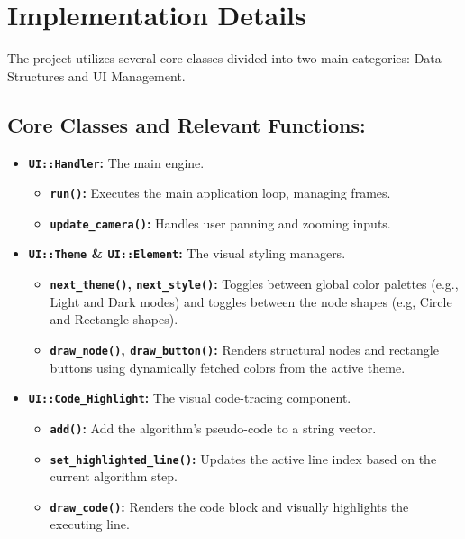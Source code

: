 \section{Implementation Details}
The project utilizes several core classes divided into two main categories: Data Structures and UI Management.

\subsection{Core Classes and Relevant Functions:}
\begin{itemize}
    \item \textbf{\texttt{UI::Handler}:} The main engine.
    \begin{itemize}
        \item \textbf{\texttt{run()}:} Executes the main application loop, managing frames.
        \item \textbf{\texttt{update\_camera()}:} Handles user panning and zooming inputs.
    \end{itemize}

    \item \textbf{\texttt{UI::Theme} \& \texttt{UI::Element}:} The visual styling managers.
    \begin{itemize}
        \item \textbf{\texttt{next\_theme()}, \texttt{next\_style()}:} Toggles between global color palettes (e.g., Light and Dark modes) and toggles between the node shapes (e.g, Circle and Rectangle shapes).
        \item \textbf{\texttt{draw\_node()}, \texttt{draw\_button()}:} Renders structural nodes and rectangle buttons using \linebreak dynamically fetched colors from the active theme.
    \end{itemize}

    \item \textbf{\texttt{UI::Code\_Highlight}:} The visual code-tracing component.
    \begin{itemize}
        \item \textbf{\texttt{add()}:} Add the algorithm's pseudo-code to a string vector.
        \item \textbf{\texttt{set\_highlighted\_line()}:} Updates the active line index based on the current algorithm step.
        \item \textbf{\texttt{draw\_code()}:} Renders the code block and visually highlights the executing line.
    \end{itemize}


\end{itemize}
